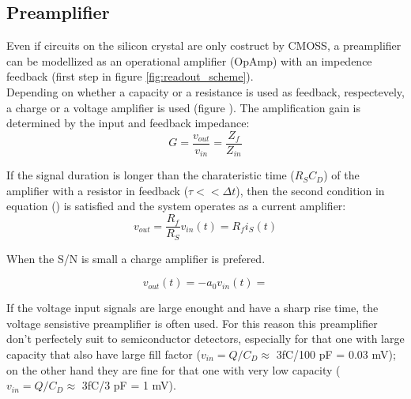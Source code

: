 \subsection{Preamplifier}
Even if circuits on the silicon crystal are only costruct by CMOSS, a
preamplifier can be modellized as an operational amplifier (OpAmp) with an impedence
feedback (first step in figure \ref{fig:readout_scheme}).\\
Depending on whether a capacity or a resistance is used as feedback, respectevely,
a charge or a voltage amplifier is used (figure ).
The amplification gain is determined by the input and feedback impedance:
\begin{equation}
   G = \frac{v_{out}}{v_{in}} = \frac{Z_{f}}{Z_{in}}
\end{equation}

If the signal duration is longer than the charateristic time ($R_S C_D$) of the amplifier with
a resistor in feedback ($\tau << \Delta t$), then the second condition in equation () is satisfied
and the system operates as a current amplifier:
\begin{equation}
   v_{out} = \frac{R_f}{R_S}v_{in}(t) = R_{f}i_{S}(t)
\end{equation}

When the S/N is small a charge amplifier is prefered.

\begin{equation}
   v_{out}(t) = -a_{0}v_{in}(t) =
\end{equation}

If the voltage input signals are large enought and have a sharp rise time, the voltage
sensistive preamplifier is often used. For this reason this preamplifier don't
perfectely suit to semiconductor detectors, especially for that one with large capacity
that also have large fill factor ($v_{in} = Q/C_{D} \approx$ 3fC/100 pF = 0.03 mV); on the other hand they are fine for that one with
very low capacity ($v_{in} = Q/C_{D} \approx$ 3fC/3 pF = 1 mV).

